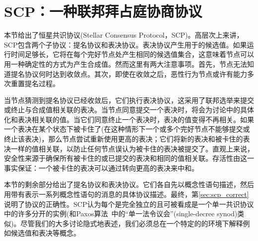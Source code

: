 \section{SCP：一种联邦拜占庭协商协议}\label{sec:scp}

本节给出了恒星共识协议(Stellar Consensus Protocol，SCP)。高层次上来讲，SCP包含两个子协议：提名协议和表决协议。表决协议产生用于{\slot}的候选值。如果运行时间足够长，它将在每个完好节点处产生相同的候选值集合，这意味着节点可以用一种确定性的方式为{\slot}产生合成值。然而这里有两大注意事项。首先，节点无法知道提名协议何时达到收敛点。其次，即使在收敛之后，恶性行为节点或许有能力多次重置提名过程。

当节点猜测到提名协议已经收敛后，它们执行表决协议，这采用了联邦选举来提交或终止与合成值相关联的表决。当节点同意提交一个表决时，将会为讨论中的{\slot}具体化和表决相关联的值。当它们同意终止一个表决时，表决的值变得不再相关。如果一个表决在某个状态下被卡住了(在这种情形下一个或多个完好节点不能够提交或终止该表决)，那么节点尝试重新使用更高的表决；它们将新的表决和被卡住的表决一样的值相关联，以防止任何节点误认为被卡住的表决被提交了。直观上来说，安全性来源于确保所有被卡住的或已提交的表决和相同的值相关联。存活性由这一事实保证：一个被卡住的表决可以通过转向更高的表决来中和。

本节的剩余部分给出了提名协议和表决协议。它们各自先以概念性语句描述，然后用带有表示一系列概念性语句的消息的具体协议描述。最终，第\ref{sec:scp_correct}说明了协议的正确性。SCP认为每个{\slot}是完全独立的且可被看成是一个单一{\slot}共识协议中的许多分开的实例(和Paxos算法~\cite{Lamport:1998:PP:279227.279229}中的``单一法令议会''(single-decree synod)类似)。尽管我们的大多讨论隐式地表述{\slot}，我们必须总在一个特定的{\slot}的环境下解释例如候选值和表决等概念。



